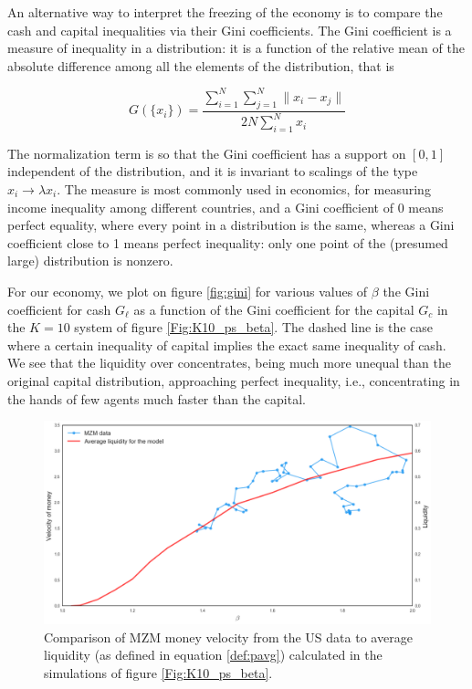 An alternative way to interpret the freezing of the economy is to compare the cash and capital inequalities via their Gini coefficients. The Gini coefficient is a measure of inequality in a distribution: it is a function of the relative mean of the absolute difference among all the elements of the distribution, that is

\begin{equation}
G(\{x_i\}) = \frac{\sum_{i=1}^N \sum_{j=1}^N \| x_i - x_j \|}{2 N \sum_{i=1}^N x_i}
\end{equation}

The normalization term is so that the Gini coefficient has a support on $[0, 1]$ independent of the distribution, and it is invariant to scalings of the type $x_i \to \lambda x_i$. The measure is most commonly used in economics, for measuring income inequality among different countries, and a Gini coefficient of $0$ means perfect equality, where every point in a distribution is the same, whereas a Gini coefficient close to 1 means perfect inequality: only one point of the (presumed large) distribution is nonzero. 

For our economy, we plot on figure \ref{fig:gini} for various values of $\beta$ the Gini coefficient for cash $G_\ell$ as a function of the Gini coefficient for the capital $G_c$ in the $K=10$ system of figure \ref{Fig:K10_ps_beta}. The dashed line is the case where a certain inequality of capital implies the exact same inequality of cash. We see that the liquidity over concentrates, being much more unequal than the original capital distribution, approaching perfect inequality, i.e., concentrating in the hands of few agents much faster than the capital.


\begin{figure}%
\centering
\includegraphics[width=\textwidth]{figs_ineq/data_model.png}
\caption{Comparison of MZM money velocity from the US data to average liquidity (as defined in equation \eqref{def:pavg}) calculated in the simulations of figure \ref{Fig:K10_ps_beta}.}
\label{fig:data_model}
\end{figure}

